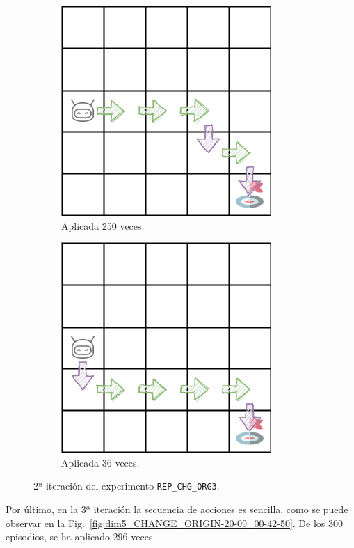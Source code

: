 \begin{figure}
    \centering
    \begin{subfigure}{.5\textwidth}
        \centering
        \includegraphics[scale=0.4]{cap5_experimentacion/images/dim5_CHANGE_ORIGIN-20_09-00_52-1, 0, 2_281.png}
        \caption{Aplicada 250 veces.}
        \label{fig:dim5_CHANGE_ORIGIN-20_09-00_52-1, 2, 0_250}
    \end{subfigure}%
    \begin{subfigure}{.5\textwidth}
        \centering
        \includegraphics[scale=0.4]{cap5_experimentacion/images/dim5_CHANGE_ORIGIN-20-09_00-42-50_155.png}
        \caption{Aplicada 36 veces.}
        \label{fig:dim5_CHANGE_ORIGIN-20_09-00_52-1, 2, 0_36}
    \end{subfigure}
    \caption{2ª iteración del experimento \texttt{REP\_CHG\_ORG3}.}
    \label{fig:dim5_CHANGE_ORIGIN-20_09-00_52-1, 2, 0_2iter}
\end{figure}

Por último, en la 3ª iteración la secuencia de acciones es sencilla, como se puede observar en la  Fig.~\ref{fig:dim5_CHANGE_ORIGIN-20-09_00-42-50}. De los 300 episodios, se ha aplicado 296 veces. 
 
